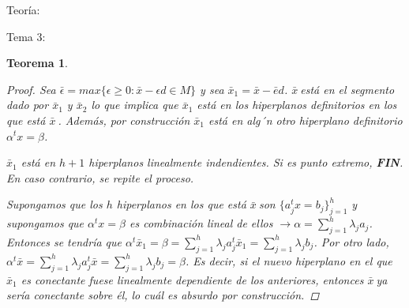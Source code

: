\documentclass{article}
\newcommand{\bx}{$\bar x \ $}
\newtheorem*{theorem*}{Teorema}
\begin{document}
\begin{section}{Teoría:}
\begin{subsection}{Tema 3:}
\begin{theorem*}{3.5}
\begin{proof}
                Sea $\bar{\epsilon} = max\{\epsilon\geq 0: \bar{x}-\epsilon d \in M\}$ y sea $\bar{x}_1 = \bar{x} - \bar{e}d$. \bx está en el segmento dado por $\bar{x}_1$ y $\bar{x}_2$ lo que implica que $\bar{x}_1$ está en los hiperplanos definitorios en los que está \bx.
                Además, por construcción $\bar{x}_1$ está en alg´n otro hiperplano definitorio $\alpha^t x =\beta$.

                $\bar{x}_1$ está en $h+1$ hiperplanos linealmente indendientes. Si es punto extremo, \textbf{FIN}. En caso contrario, se repite el proceso.

                Supongamos que los $h$ hiperplanos en los que está \bx son $\{a^t_j x = b_j\}^h_{j=1}$ y supongamos que $\alpha^t x = \beta$ es combinación lineal de ellos $\longrightarrow \alpha = \sum_{j=1}^{h}\lambda_j a_j$. Entonces
                se tendría que $\alpha^t \bar{x}_1 = \beta = \sum_{j=1}^{h}\lambda_j a^t_j \bar{x}_1 = \sum_{j=1}^{h}\lambda_j b_j$. Por otro lado, $\alpha^t \bar{x} = \sum_{j=1}^{h}\lambda_j a^t_j \bar{x} = \sum_{j=1}^{h}\lambda_j b_j = \beta$.
                Es decir, si el nuevo hiperplano en el que $\bar{x}_1$ es conectante fuese linealmente dependiente de los anteriores, entonces \bx ya sería conectante sobre él, lo cuál es absurdo por construcción.
            \end{proof}
        \end{theorem*}

	\end{subsection}

\end{section}
\end{document}
